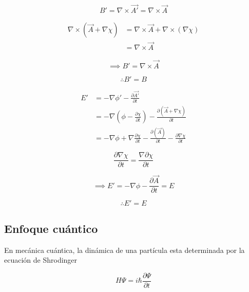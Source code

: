 \documentclass[12pt]{article}
\begin{document}
\begin{equation}
B'=\nabla\times\vec{A'}=\nabla\times\vec{A}
\end{equation}

\begin{equation}
\begin{split}
\nabla\times(\vec{A}+\nabla\chi) &=\nabla\times\vec{A}+\nabla\times(\nabla\chi)\\ & =\nabla\times\vec{A}
\end{split}
\end{equation}

\begin{equation}
\implies B'=\nabla\times\vec{A}
\end{equation}

\begin{equation}
\therefore B'=B
\end{equation}

\begin{equation}
\begin{split}
E'& =-\nabla\phi'-\frac{\partial\vec{A'}}{\partial t}\\
& =-\nabla(\phi-\frac{\partial\chi}{\partial t})-\frac{\partial(\vec{A}+\nabla\chi)}{\partial t} \\ 
&  =-\nabla\phi+\nabla\frac{\partial\chi}{\partial t}-\frac{\partial(\vec{A})}{\partial t}-\frac{\partial\nabla\chi}{\partial t}
\end{split}
\end{equation}


\begin{equation}
\frac{\partial\nabla\chi}{\partial t}=\frac{\nabla\partial\chi}{\partial t}
\end{equation}

\begin{equation}
\implies E'=-\nabla\phi-\frac{\partial\vec{A}}{\partial t}=E
\end{equation}

\begin{equation}
\therefore  E'=E
\end{equation}

\subsection{Enfoque cuántico}
En mecánica cuántica, la dinámica de una partícula esta determinada por la ecuación de Shrodinger

\begin{equation}
H\Psi=i\hbar\frac{\partial\Psi}{\partial t}
\end{equation}
\end{document}
